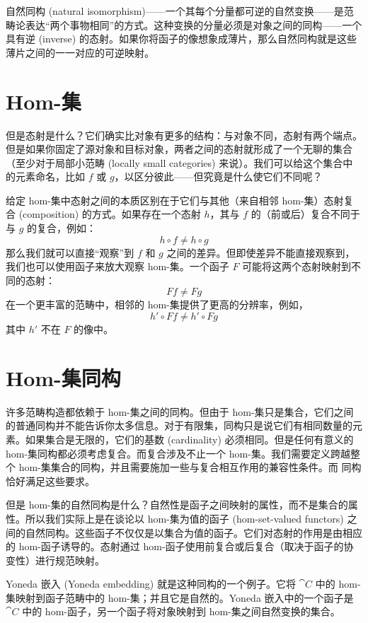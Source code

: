自然同构 (natural isomorphism)——一个其每个分量都可逆的自然变换——是范畴论表达“两个事物相同”的方式。这种变换的分量必须是对象之间的同构——一个具有逆 (inverse) 的态射。如果你将函子的像想象成薄片，那么自然同构就是这些薄片之间的一一对应的可逆映射。

\section{Hom-集}

但是态射是什么？它们确实比对象有更多的结构：与对象不同，态射有两个端点。但是如果你固定了源对象和目标对象，两者之间的态射就形成了一个无聊的集合（至少对于局部小范畴 (locally small categories) 来说）。我们可以给这个集合中的元素命名，比如 $f$ 或 $g$，以区分彼此——但究竟是什么使它们不同呢？

给定 hom-集中态射之间的本质区别在于它们与其他（来自相邻 hom-集）态射复合 (composition) 的方式。如果存在一个态射 $h$，其与 $f$ 的（前或后）复合不同于与 $g$ 的复合，例如：
\[h \circ f \neq h \circ g\]
那么我们就可以直接“观察”到 $f$ 和 $g$ 之间的差异。但即使差异不能直接观察到，我们也可以使用函子来放大观察 hom-集。一个函子 $F$ 可能将这两个态射映射到不同的态射：
\[F f \neq F g\]
在一个更丰富的范畴中，相邻的 hom-集提供了更高的分辨率，例如，
\[h' \circ F f \neq h' \circ F g\]
其中 $h'$ 不在 $F$ 的像中。

\section{Hom-集同构}

许多范畴构造都依赖于 hom-集之间的同构。但由于 hom-集只是集合，它们之间的普通同构并不能告诉你太多信息。对于有限集，同构只是说它们有相同数量的元素。如果集合是无限的，它们的基数 (cardinality) 必须相同。但是任何有意义的 hom-集同构都必须考虑复合。而复合涉及不止一个 hom-集。我们需要定义跨越整个 hom-集集合的同构，并且需要施加一些与复合相互作用的兼容性条件。而  同构恰好满足这些要求。

但是 hom-集的自然同构是什么？自然性是函子之间映射的属性，而不是集合的属性。所以我们实际上是在谈论以 hom-集为值的函子 (hom-set-valued functors) 之间的自然同构。这些函子不仅仅是以集合为值的函子。它们对态射的作用是由相应的 hom-函子诱导的。态射通过 hom-函子使用前复合或后复合（取决于函子的协变性）进行规范映射。

Yoneda 嵌入 (Yoneda embedding) 就是这种同构的一个例子。它将 $\cat{C}$ 中的 hom-集映射到函子范畴中的 hom-集；并且它是自然的。Yoneda 嵌入中的一个函子是 $\cat{C}$ 中的 hom-函子，另一个函子将对象映射到 hom-集之间自然变换的集合。

